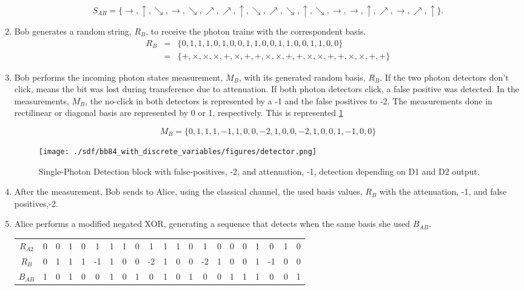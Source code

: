 \begin{refsection}
\begin{enumerate}
	$$S_{AB} = \{\to, \uparrow, \searrow, \to, \searrow, \nearrow, \nearrow, \uparrow, \searrow, \nearrow, \searrow, \uparrow, \searrow, \to, \to, \uparrow, \nearrow, \to, \nearrow, \uparrow\}.$$
	
	\item Bob generates a random string, $R_{B}$, to receive the photon trains with the correspondent basis.
	\begin{eqnarray}
		R_{B} &=& \{0,1,1,1,0,1,0,0,1,1,0,0,1,1,0,0,1,1,0,0\} \nonumber\\
		&=&\{+,\times,\times,\times,+,\times,+,+,\times,\times,+,+,\times,\times,+,+,\times,\times,+,+\} \nonumber
	\end{eqnarray}
	
	\item Bob performs the incoming photon states measurement, $M_{B}$, with its generated random basis, $R_{B}$. If the two photon detectors don't click, means the bit was lost during transference due to attenuation. If both photon detectors click, a false positive was detected. In the measurements, $M_{B}$, the no-click in both detectors is represented by a -1 and the false positives to -2. The measurements done in rectilinear or diagonal basis are represented by 0 or 1, respectively. This is represented \ref{fig:bb84 detector}
	
	$$M_{B} = \{0,1,1,1,-1,1,0,0,-2,1,0,0,-2,1,0,0,1,-1,0,0\}$$	

	\begin{figure}[H]
		\centering
		\texttt{[image: ./sdf/bb84\_with\_discrete\_variables/figures/detector.png]}
		\caption{Single-Photon Detection block with false-positives, -2, and attenuation, -1, detection depending on D1 and D2 output.\label{fig:bb84 detector}}
	\end{figure}
	
	\item After the measurement, Bob sends to Alice, using the classical channel, the used basis values, $R_{B}$ with the attenuation, -1, and false positives,-2.
	\item Alice performs a modified negated XOR, generating a sequence that detects when the same basis she used $B_{AB}$.
	
	\begin{table}[H]
		\centering
		\begin{tabular}{c|c c c c c c c c c c c c c c c c c c c c}
			$R_{A2}$ & 0 & 0 & 1 & 0 &  1 & 1 & 1 & 0 &  1 & 1 & 1 & 0 &  1 & 0 & 0 & 0 & 1 &  0 & 1 & 0 \\
			$R_{B}$  & 0 & 1 & 1 & 1 & -1 & 1 & 0 & 0 & -2 & 1 & 0 & 0 & -2 & 1 & 0 & 0 & 1 & -1 & 0 & 0 \\ \hline
			$B_{AB}$ & 1 & 0 & 1 & 0 &  0 & 1 & 0 & 1 &  0 & 1 & 0 & 1 &  0 & 0 & 1 & 1 & 1 &  0 & 0 & 1 \\
		\end{tabular}
	\end{table}


\end{enumerate}
\end{refsection}
